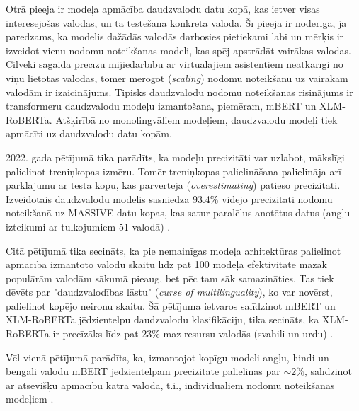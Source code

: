 Otrā pieeja ir modeļa apmācība daudzvalodu datu kopā, kas ietver visas interesējošās valodas, un tā testēšana konkrētā valodā. Šī pieeja ir noderīga, ja paredzams, ka modelis dažādās valodās darbosies pietiekami labi un mērķis ir izveidot vienu nodomu noteikšanas modeli, kas spēj apstrādāt vairākas valodas. 
Cilvēki sagaida precīzu mijiedarbību ar virtuālajiem asistentiem neatkarīgi no viņu lietotās valodas, tomēr mērogot (\textit{scaling}) nodomu noteikšanu uz vairākām valodām ir izaicinājums.
Tipisks daudzvalodu nodomu noteikšanas risinājums ir transformeru daudzvalodu modeļu izmantošana, piemēram, mBERT un XLM-RoBERTa. 
Atšķirībā no monolingvāliem modeļiem, daudzvalodu modeļi tiek apmācīti uz daudzvalodu datu kopām.
 
2022. gada pētījumā \cite{de-bruyn-2022} tika parādīts, ka modeļu precizitāti var uzlabot, mākslīgi palielinot treniņkopas izmēru. Tomēr treniņkopas palielināšana palielināja arī pārklājumu ar testa kopu, kas pārvērtēja (\textit{overestimating}) patieso precizitāti.
Izveidotais daudzvalodu modelis sasniedza 93.4\% vidējo precizitāti nodomu noteikšanā uz MASSIVE datu kopas, kas satur paralēlus anotētus datus (angļu izteikumi ar tulkojumiem 51 valodā) \cite{fitzgerald2022}.

Citā pētījumā tika secināts, ka pie nemainīgas modeļa arhitektūras palielinot apmācībā izmantoto valodu skaitu līdz pat 100 modeļa efektivitāte mazāk populārām valodām sākumā pieaug, bet pēc tam sāk samazināties. Tas tiek dēvēts par "daudzvalodības lāstu" (\textit{curse of multilinguality}), ko var novērst, palielinot kopējo neironu skaitu.
Šā pētījuma ietvaros salīdzinot mBERT un XLM-RoBERTa jēdzientelpu daudzvalodu klasifikāciju, tika secināts, ka XLM-RoBERTa ir precīzāks līdz pat 23\% maz-resursu valodās (svahili un urdu) \cite{conneau2020}.

Vēl vienā pētījumā parādīts, ka, izmantojot kopīgu modeli angļu, hindi un bengali valodu mBERT jēdzientelpām precizitāte palielinās par $\sim2\%$, salīdzinot ar atsevišķu apmācību katrā valodā, t.i., individuāliem nodomu noteikšanas modeļiem \cite{firdaus2023}.


